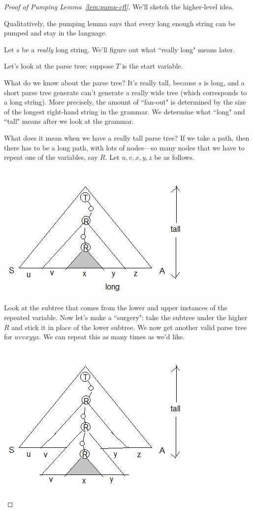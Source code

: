 \begin{proof}[Proof of Pumping Lemma~\ref{lem:pump-cfl}]
We'll sketch the higher-level idea.

Qualitatively, the pumping lemma says that every long enough string can be pumped and stay in the language.

Let $s$ be a {\it really} long string. We'll figure out what ``really long" means later.

Let's look at the parse tree; suppose $T$ is the start variable.

What do we know about the parse tree? It's really tall, because $s$ is long, and a short parse tree generate can't generate a really wide tree (which corresponds to a long string).
More precisely, the amount of ``fan-out" is determined by the size of the longest right-hand string in the grammar. We determine what ``long" and ``tall" means after we look at the grammar.%


What does it mean when we have a really tall parse tree? If we take a path, then there has to be a long path, with lots of nodes---so many nodes that we have to repeat one of the variables, say $R$. Let $u,v,x,y,z$ be as follows.

\begin{center}
\includegraphics{5-2}
\end{center}

Look at the subtree that comes from the lower and upper instances of the repeated variable. Now let's make a ``surgery": take the subtree under the higher $R$ and stick it in place of the lower subtree. We now get another valid parse tree for $uvvxyyz$. We can repeat this as many times as we'd like.


\begin{center}
\includegraphics{5-3}
\end{center}



\end{proof}
